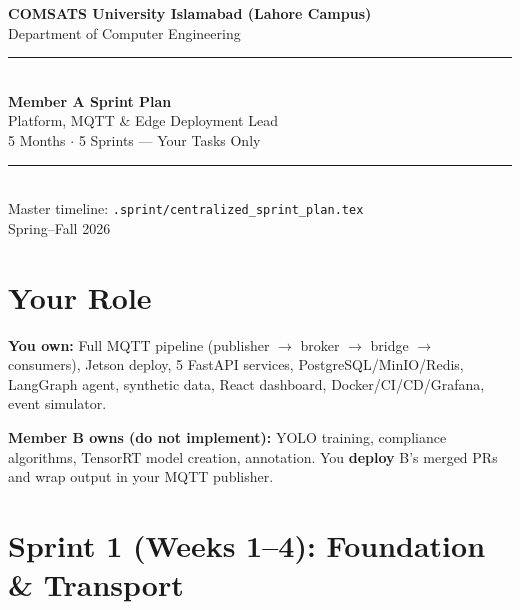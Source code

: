 \documentclass[12pt,a4paper]{article}
\begin{document}

\begin{titlepage}
\centering
\vspace*{1cm}
{\Large\color{primary}\textbf{COMSATS University Islamabad (Lahore Campus)}}\\[0.2cm]
{\large Department of Computer Engineering}\\[0.5cm]
\rule{\textwidth}{2pt}\\[0.8cm]
{\Huge\bfseries\color{primary} Member A Sprint Plan}\\[0.4cm]
{\Large Platform, MQTT \& Edge Deployment Lead}\\[0.2cm]
{\large 5 Months $\cdot$ 5 Sprints --- Your Tasks Only}\\[0.3cm]
\rule{\textwidth}{2pt}\\[1cm]
{\small Master timeline: \texttt{.sprint/centralized\_sprint\_plan.tex}}\\
\vfill
{\large Spring--Fall 2026}
\end{titlepage}

\tableofcontents
\newpage

\section{Your Role}

\begin{scopebox}
\textbf{You own:} Full MQTT pipeline (publisher $\rightarrow$ broker $\rightarrow$ bridge $\rightarrow$ consumers), Jetson deploy, 5 FastAPI services, PostgreSQL/MinIO/Redis, LangGraph agent, synthetic data, React dashboard, Docker/CI/CD/Grafana, event simulator.
\end{scopebox}

\begin{outofscopebox}
\textbf{Member B owns (do not implement):} YOLO training, compliance algorithms, TensorRT model creation, annotation. You \textbf{deploy} B's merged PRs and wrap output in your MQTT publisher.
\end{outofscopebox}

\section{Sprint 1 (Weeks 1--4): Foundation \& Transport}
\end{document}
